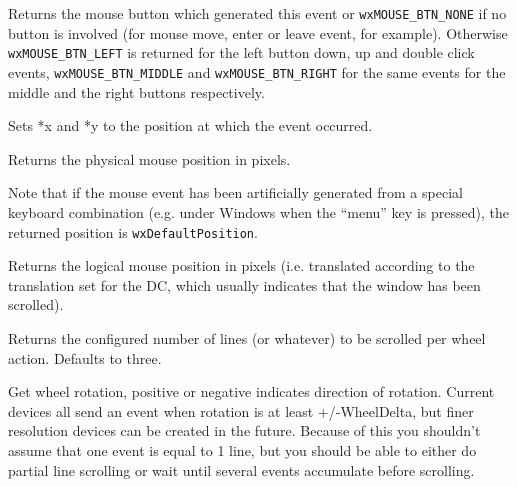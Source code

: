 \label{wxmouseeventgetbutton}


Returns the mouse button which generated this event or {\tt wxMOUSE\_BTN\_NONE} 
if no button is involved (for mouse move, enter or leave event, for example).
Otherwise {\tt wxMOUSE\_BTN\_LEFT} is returned for the left button down, up and
double click events, {\tt wxMOUSE\_BTN\_MIDDLE} and {\tt wxMOUSE\_BTN\_RIGHT} 
for the same events for the middle and the right buttons respectively.


\label{wxmouseeventgetposition}




Sets *x and *y to the position at which the event occurred.

Returns the physical mouse position in pixels.

Note that if the mouse event has been artificially generated from a special
keyboard combination (e.g. under Windows when the ``menu'' key is pressed), the
returned position is \texttt{wxDefaultPosition}.


\label{wxmouseeventgetlogicalposition}


Returns the logical mouse position in pixels (i.e. translated according to the
translation set for the DC, which usually indicates that the window has been scrolled).



\label{wxmouseeventgetlinesperaction}


Returns the configured number of lines (or whatever) to be scrolled per
wheel action.  Defaults to three.


\label{wxmouseeventgetwheelrotation}


Get wheel rotation, positive or negative indicates direction of
rotation.  Current devices all send an event when rotation is at least
+/-WheelDelta, but finer resolution devices can be created in the future.
Because of this you shouldn't assume that one event is equal to 1 line, but you
should be able to either do partial line scrolling or wait until several
events accumulate before scrolling.


